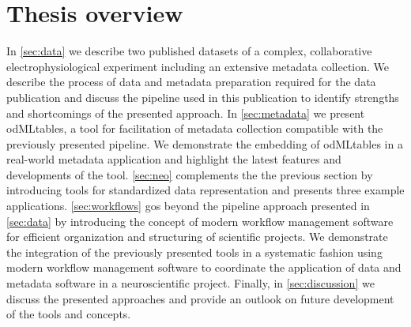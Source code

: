 \section{Thesis overview}
In \cref{sec:data} we describe two published datasets of a complex, collaborative electrophysiological experiment including an extensive metadata collection. We describe the process of data and metadata preparation required for the data publication and discuss the pipeline used in this publication to identify strengths and shortcomings of the presented approach. In \cref{sec:metadata} we present odMLtables, a tool for facilitation of metadata collection compatible with the previously presented pipeline. We demonstrate the embedding of odMLtables in a real-world metadata application and highlight the latest features and developments of the tool. \cref{sec:neo} complements the the previous section by introducing tools for standardized data representation and presents three example applications. \cref{sec:workflows} gos beyond the pipeline approach presented in \cref{sec:data} by introducing the concept of modern workflow management software for efficient organization and structuring of scientific projects. We demonstrate the integration of the previously presented tools in a systematic fashion using modern workflow management software to coordinate the application of data and metadata software in a neuroscientific project. Finally, in \cref{sec:discussion} we discuss the presented approaches and provide an outlook on future development of the tools and concepts.












































